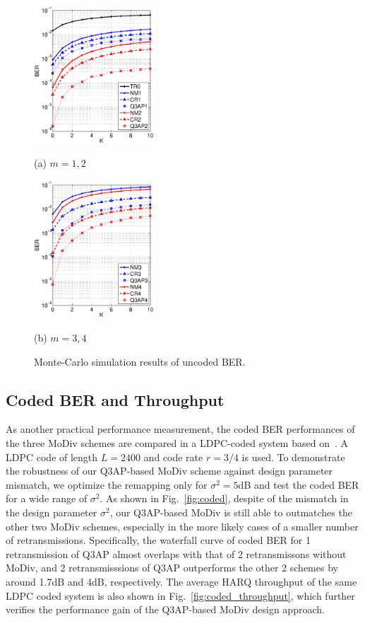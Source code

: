 \documentclass[journal,draftcls,onecolumn,12pt,twoside]{IEEEtran}
\begin{document}
\begin{figure}[!t]
  \begin{minipage}[b]{.48\linewidth}
    \centering
    \centerline{\includegraphics[width=4.5cm]{./figs/BER_K_MonteCarlo_64QAM_12.eps}}
    \centerline{(a) $m=1,2$}\medskip
  \end{minipage}
  \hfill
  \begin{minipage}[b]{0.48\linewidth}
    \centering
    \centerline{\includegraphics[width=4.5cm]{./figs/BER_K_MonteCarlo_64QAM_34.eps}}
    \centerline{(b) $m=3,4$}\medskip
  \end{minipage}
  \caption{Monte-Carlo simulation results of uncoded BER.}
  \label{fig:uncoded_K_mc}
\end{figure}

\subsection{Coded BER and Throughput}
As another practical performance measurement, the coded BER performances of
the three MoDiv schemes are compared in a LDPC-coded system based on~\cite{}. A
LDPC code of length $L=2400$ and code rate $r=3/4$ is used. To demonstrate the
robustness of our Q3AP-based MoDiv scheme against design parameter mismatch, we
optimize the remapping only for $\sigma^2 = 5$dB and test the coded BER for a
wide range of $\sigma^2$. As shown in Fig.~\ref{fig:coded}, despite of the
mismatch in the design parameter $\sigma^2$, our Q3AP-based MoDiv is still able
to outmatches the other two MoDiv schemes, especially in the more likely
cases of a smaller number of retransmissions. 
Specifically, the waterfall curve of coded BER for 1 retransmission of Q3AP
almost overlaps with that of 2 retransmissons without MoDiv, and 2
retransmisssions of Q3AP outperforms the other 2 schemes by around 1.7dB and
4dB, respectively. The average HARQ throughput of the same LDPC coded system is
also shown in Fig.~\ref{fig:coded_throughput}, which further verifies the
performance gain of the Q3AP-based MoDiv design approach. 
\end{document}
